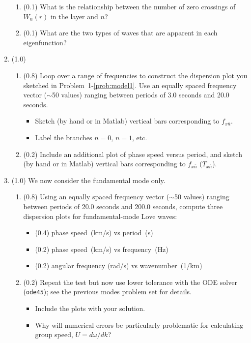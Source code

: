 \documentclass[11pt,titlepage,fleqn]{article}
\newcommand{\cutoff}[1]{{#1}_{x\bar{n}}}
\begin{document}
\begin{enumerate}
\begin{enumerate}
\item (0.1) What is the relationship between the number of zero crossings of $W_n(r)$ in the layer and $n$?
\item (0.1) What are the two types of waves that are apparent in each eigenfunction?
\end{enumerate}



\item (1.0)
\begin{enumerate}
\item (0.8) Loop over a range of frequencies to construct the dispersion plot you sketched in Problem~1-\ref{prob:model1}. Use an equally spaced frequency vector ($\sim$50 values) ranging between periods of 3.0 seconds and 20.0 seconds.
%
\begin{itemize}
\item Sketch (by hand or in Matlab) vertical bars corresponding to $\cutoff{f}$.
\item Label the branches $n=0$, $n=1$, etc.
\end{itemize}

\item (0.2) Include an additional plot of phase speed versus period, and sketch (by hand or in Matlab) vertical bars corresponding to $\cutoff{f}$ ($\cutoff{T}$).
\end{enumerate}


\item (1.0) We now consider the fundamental mode only.

\begin{enumerate}
\item (0.8) Using an equally spaced frequency vector ($\sim$50 values) ranging between periods of 20.0 seconds and 200.0 seconds, compute three dispersion plots for fundamental-mode Love waves:
%
\begin{itemize}
\item (0.4) phase speed~(km/s) vs period~(s)
\item (0.2) phase speed~(km/s) vs frequency~(Hz)
\item (0.2) angular frequency (rad/s) vs wavenumber~(1/km)
\end{itemize}

\item (0.2) Repeat the test but now use lower tolerance with the ODE solver (\verb+ode45+); see the previous modes problem set for details.
%
\begin{itemize}
\item Include the plots with your solution.
\item Why will numerical errors be particularly problematic for calculating group speed, $U = d\omega/dk$?
\end{itemize}


\end{enumerate}
\end{enumerate}
\end{document}
